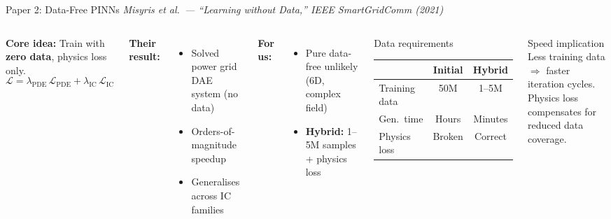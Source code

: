 \documentclass[aspectratio=169, 11pt]{beamer}
\begin{document}
\begin{frame}{Paper 2: Data-Free PINNs}
  \textit{Misyris et al.\ --- ``Learning without Data,'' IEEE SmartGridComm (2021)}

  \begin{columns}[T]
    \textbf{Core idea:} Train with \textbf{zero data}, physics loss only.
    \[
      \mathcal{L} = \lambda_\text{PDE}\,\mathcal{L}_\text{PDE} + \lambda_\text{IC}\,\mathcal{L}_\text{IC}
    \]

    \textbf{Their result:}
    \begin{itemize}\setlength{\itemsep}{1pt}
      \item Solved power grid DAE system (no data)
      \item Orders-of-magnitude speedup
      \item Generalises across IC families
    \end{itemize}

    \textbf{For us:}
    \begin{itemize}\setlength{\itemsep}{1pt}
      \item Pure data-free unlikely (6D, complex field)
      \item \textbf{Hybrid:} 1--5M samples + physics loss
    \end{itemize}

    \begin{block}{Data requirements}
      \centering\small
      \begin{tabular}{lcc}
        \toprule
        & \textbf{Initial} & \textbf{Hybrid} \\
        \midrule
        Training data & 50M & 1--5M \\
        Gen.\ time & Hours & Minutes \\
        Physics loss & Broken & Correct \\
        \bottomrule
      \end{tabular}
    \end{block}

    \begin{alertblock}{Speed implication}
      Less training data $\Rightarrow$ faster iteration cycles.\\
      Physics loss compensates for reduced data coverage.
    \end{alertblock}
  \end{columns}
\end{frame}
\end{document}
